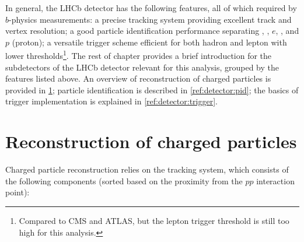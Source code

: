 In general, the LHCb detector has the following features,
all of which required by $b$-physics measurements:
a precise tracking system providing excellent track and vertex resolution;
a good particle identification performance separating \pion, \kaon, $e$, \muon,
and $p$ (proton);
a versatile trigger scheme efficient for both hadron and lepton
with lower \pt thresholds\footnote{
    Compared to CMS and ATLAS, but the lepton trigger \pt threshold is still too
    high for this analysis.
}.
The rest of chapter provides a brief introduction for the subdetectors of the
LHCb detector relevant for this analysis, grouped by the features listed above.
An overview of reconstruction of charged particles is provided in
\cref{ref:detector:tracking};
particle identification is described in \cref{ref:detector:pid};
the basics of trigger implementation is explained in
\cref{ref:detector:trigger}.


\section{Reconstruction of charged particles}
\label{ref:detector:tracking}

Charged particle reconstruction relies on the tracking system,
which consists of the following components
(sorted based on the proximity from the $pp$ interaction point):

